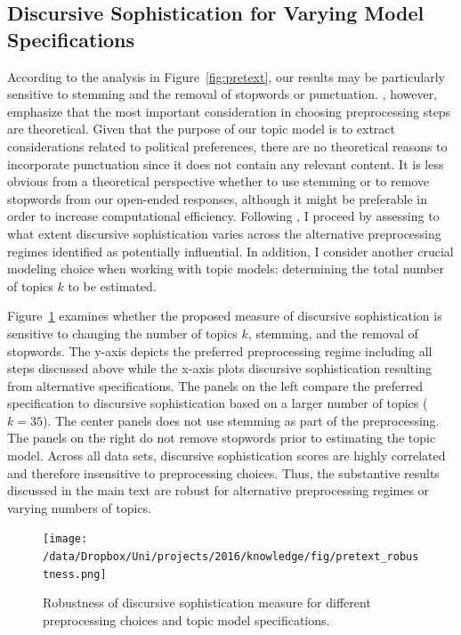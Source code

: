 \clearpage
\subsection{Discursive Sophistication for Varying Model Specifications}

According to the analysis in Figure~\ref{fig:pretext}, our results may be particularly sensitive to stemming and the removal of stopwords or punctuation. \citet{denny2018text}, however, emphasize that the most important consideration in choosing preprocessing steps are theoretical. Given that the purpose of our topic model is to extract considerations related to political preferences, there are no theoretical reasons to incorporate punctuation since it does not contain any relevant content. It is less obvious from a theoretical perspective whether to use stemming or to remove stopwords from our open-ended responses, although it might be preferable in order to increase computational efficiency. Following \citet{denny2018text}, I proceed by assessing to what extent discursive sophistication varies across the alternative preprocessing regimes identified as potentially influential. In addition, I consider another crucial modeling choice when working with topic models: determining the total number of topics $k$ to be estimated.

Figure~\ref{fig:pretext_robustness} examines whether the proposed measure of discursive sophistication is sensitive to changing the number of topics $k$, stemming, and the removal of stopwords. The y-axis depicts the preferred preprocessing regime including all steps discussed above while the x-axis plots discursive sophistication resulting from alternative specifications. The panels on the left compare the preferred specification to discursive sophistication based on a larger number of topics ($k=35$). The center panels does not use stemming as part of the preprocessing. The panels on the right do not remove stopwords prior to estimating the topic model. Across all data sets, discursive sophistication scores are highly correlated and therefore insensitive to preprocessing choices. Thus, the substantive results discussed in the main text are robust for alternative preprocessing regimes or varying numbers of topics.


\begin{figure}[h]\centering
\texttt{[image: /data/Dropbox/Uni/projects/2016/knowledge/fig/pretext\_robustness.png]}
\caption[Robustness of discursive sophistication measure for different preprocessing choices and topic model specifications]{Robustness of discursive sophistication measure for different preprocessing choices and topic model specifications.}\label{fig:pretext_robustness}
\end{figure}

